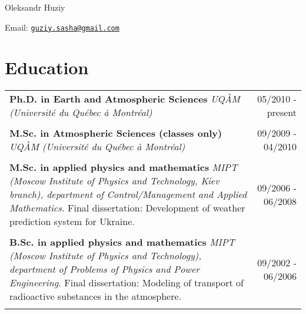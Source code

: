\documentclass[letterpaper]{article}
\def\name{Oleksandr Huziy}
\begin{document}
{\huge \name}


\vspace{0.25in}

\begin{minipage}{0.45\linewidth}
  Email: \href{mailto:guziy.sasha@gmail.com}{\tt guziy.sasha@gmail.com}
\end{minipage}



\section*{Education}

\setlength\LTleft{0pt}
\setlength\LTright{0pt}

\begin{longtable}{@{}l@{\extracolsep{\fill}}r@{}}
\begin{minipage}[t]{10cm}
\textbf{Ph.D. in Earth and Atmospheric Sciences} \newline 
\emph{UQÀM (Université du Québec à Montréal)}
\end{minipage}
&
05/2010 - present \\ \\

\begin{minipage}[t]{10cm}
\textbf{M.Sc. in Atmospheric Sciences (classes only)}\newline 
\emph{UQÀM (Université du Québec à Montréal)}
\end{minipage}
&
09/2009 - 04/2010 \\ \\

\begin{minipage}[t]{10cm}
\textbf{M.Sc. in applied physics and mathematics}\newline 
\emph{MIPT (Moscow
Institute of Physics and Technology, Kiev branch), department of
Control/Management and \newline Applied Mathematics.} \newline
Final dissertation: Development of weather prediction system for
Ukraine.
\end{minipage}
&
09/2006 - 06/2008 \\ \\

\begin{minipage}[t]{10cm}
\textbf{B.Sc. in applied physics and mathematics}\newline 
\emph{MIPT (Moscow
Institute of Physics and Technology), department of
Problems of Physics and Power Engineering.} \newline
Final dissertation: Modeling of transport of radioactive substances in the
atmosphere.
\end{minipage}
&
09/2002 - 06/2006 \\ \\
\end{longtable}
\end{document}
